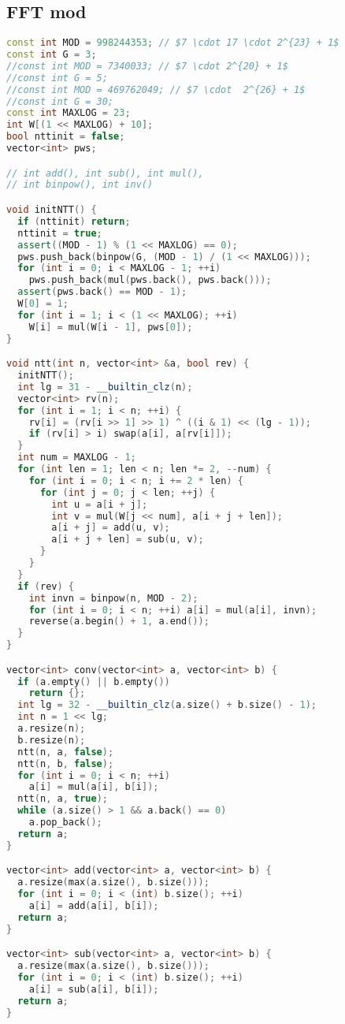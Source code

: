 \documentclass[9pt,a4paper,landscape,twosided]{extarticle}
\begin{document}
\begin{multicols*}{3}
\begin{lstlisting}[language=C++]
\end{lstlisting}

\subsection{FFT mod}
\begin{lstlisting}[language=C++]
const int MOD = 998244353; // $7 \cdot 17 \cdot 2^{23} + 1$
const int G = 3;
//const int MOD = 7340033; // $7 \cdot 2^{20} + 1$
//const int G = 5;
//const int MOD = 469762049; // $7 \cdot  2^{26} + 1$
//const int G = 30;
const int MAXLOG = 23;
int W[(1 << MAXLOG) + 10];
bool nttinit = false;
vector<int> pws;

// int add(), int sub(), int mul(),
// int binpow(), int inv()

void initNTT() {
  if (nttinit) return;
  nttinit = true;
  assert((MOD - 1) % (1 << MAXLOG) == 0);
  pws.push_back(binpow(G, (MOD - 1) / (1 << MAXLOG)));
  for (int i = 0; i < MAXLOG - 1; ++i)
    pws.push_back(mul(pws.back(), pws.back()));
  assert(pws.back() == MOD - 1);
  W[0] = 1;
  for (int i = 1; i < (1 << MAXLOG); ++i)
    W[i] = mul(W[i - 1], pws[0]);
}

void ntt(int n, vector<int> &a, bool rev) {
  initNTT();
  int lg = 31 - __builtin_clz(n);
  vector<int> rv(n);
  for (int i = 1; i < n; ++i) {
    rv[i] = (rv[i >> 1] >> 1) ^ ((i & 1) << (lg - 1));
    if (rv[i] > i) swap(a[i], a[rv[i]]);
  }
  int num = MAXLOG - 1;
  for (int len = 1; len < n; len *= 2, --num) {
    for (int i = 0; i < n; i += 2 * len) {
      for (int j = 0; j < len; ++j) {
        int u = a[i + j];
        int v = mul(W[j << num], a[i + j + len]);
        a[i + j] = add(u, v);
        a[i + j + len] = sub(u, v);
      }
    }
  }
  if (rev) {
    int invn = binpow(n, MOD - 2);
    for (int i = 0; i < n; ++i) a[i] = mul(a[i], invn);
    reverse(a.begin() + 1, a.end());
  }
}

vector<int> conv(vector<int> a, vector<int> b) {
  if (a.empty() || b.empty())
    return {};
  int lg = 32 - __builtin_clz(a.size() + b.size() - 1);
  int n = 1 << lg;
  a.resize(n);
  b.resize(n);
  ntt(n, a, false);
  ntt(n, b, false);
  for (int i = 0; i < n; ++i)
    a[i] = mul(a[i], b[i]);
  ntt(n, a, true);
  while (a.size() > 1 && a.back() == 0)
    a.pop_back();
  return a;
}

vector<int> add(vector<int> a, vector<int> b) {
  a.resize(max(a.size(), b.size()));
  for (int i = 0; i < (int) b.size(); ++i)
    a[i] = add(a[i], b[i]);
  return a;
}

vector<int> sub(vector<int> a, vector<int> b) {
  a.resize(max(a.size(), b.size()));
  for (int i = 0; i < (int) b.size(); ++i)
    a[i] = sub(a[i], b[i]);
  return a;
}


\end{lstlisting}
\end{multicols*}
\end{document}

